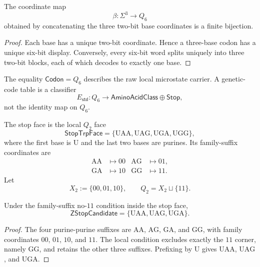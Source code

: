 \begin{theorem}
\label{thm:philosophy-spectral-inverse-codon-cube}
The coordinate map
$$
  \beta:\Sigma^{3}\to Q_{6}
$$
obtained by concatenating the three two-bit base coordinates is a finite
bijection.
\end{theorem}
\begin{proof}
Each base has a unique two-bit coordinate. Hence a three-base codon has a
unique six-bit display. Conversely, every six-bit word splits uniquely
into three two-bit blocks, each of which decodes to exactly one base.
\end{proof}

\begin{corollary}
\label{cor:philosophy-spectral-inverse-carrier-classifier-distinct}
The equality $\mathsf{Codon}=Q_{6}$ describes the raw local microstate
carrier. A genetic-code table is a classifier
$$
  E_{\mathsf{std}}:Q_{6}\to
  \mathsf{AminoAcidClass}\oplus\mathsf{Stop},
$$
not the identity map on $Q_{6}$.
\end{corollary}

\begin{definition}
\label{def:philosophy-spectral-inverse-local-stop-face}
The stop face is the local $Q_{2}$ face
$$
  \mathsf{StopTrpFace}=
  \{\mathrm{UAA},\mathrm{UAG},\mathrm{UGA},\mathrm{UGG}\},
$$
where the first base is $\mathrm{U}$ and the last two bases are purines.
Its family-suffix coordinates are
$$
\begin{aligned}
  \mathrm{AA}&\longmapsto 00&
  \mathrm{AG}&\longmapsto 01,\\
  \mathrm{GA}&\longmapsto 10&
  \mathrm{GG}&\longmapsto 11.
\end{aligned}
$$
Let
$$
  X_{2}:=\{00,01,10\},
  \qquad
  Q_{2}=X_{2}\sqcup\{11\}.
$$
\end{definition}

\begin{theorem}
\label{thm:philosophy-spectral-inverse-three-stop-reconstruction}
Under the family-suffix no-$11$ condition inside the stop face,
$$
  \mathsf{ZStopCandidate}=
  \{\mathrm{UAA},\mathrm{UAG},\mathrm{UGA}\}.
$$
\end{theorem}
\begin{proof}
The four purine-purine suffixes are $\mathrm{AA}$, $\mathrm{AG}$,
$\mathrm{GA}$, and $\mathrm{GG}$, with family coordinates $00$, $01$,
$10$, and $11$. The local condition excludes exactly the $11$ corner,
namely $\mathrm{GG}$, and retains the other three suffixes. Prefixing by
$\mathrm{U}$ gives $\mathrm{UAA}$, $\mathrm{UAG}$, and $\mathrm{UGA}$.
\end{proof}

